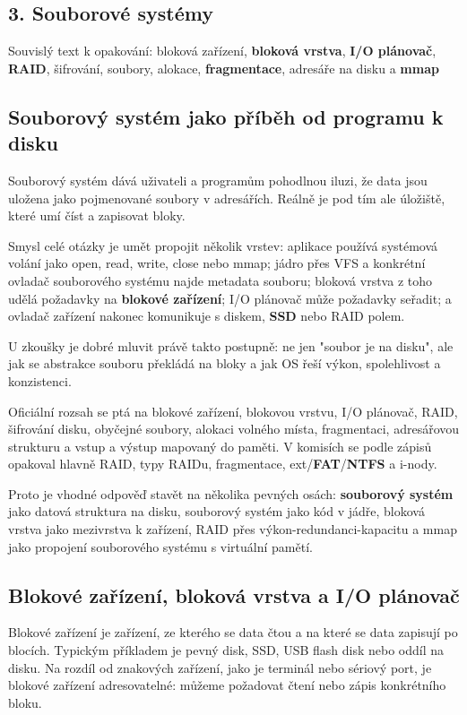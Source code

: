 \subsection*{3. Souborové systémy}

Souvislý text k opakování: bloková zařízení, \textbf{bloková vrstva}, \textbf{I/O plánovač}, \textbf{RAID}, šifrování, soubory, alokace, \textbf{fragmentace}, adresáře na disku a \textbf{mmap}

\subsection*{Souborový systém jako příběh od programu k disku}

Souborový systém dává uživateli a programům pohodlnou iluzi, že data jsou uložena jako pojmenované soubory v adresářích. Reálně je pod tím ale úložiště, které umí číst a zapisovat bloky.

Smysl celé otázky je umět propojit několik vrstev: aplikace používá systémová volání jako open, read, write, close nebo mmap; jádro přes VFS a konkrétní ovladač souborového systému najde metadata souboru; bloková vrstva z toho udělá požadavky na \textbf{blokové zařízení}; I/O plánovač může požadavky seřadit; a ovladač zařízení nakonec komunikuje s diskem, \textbf{SSD} nebo RAID polem.

U zkoušky je dobré mluvit právě takto postupně: ne jen "soubor je na disku", ale jak se abstrakce souboru překládá na bloky a jak OS řeší výkon, spolehlivost a konzistenci.

Oficiální rozsah se ptá na blokové zařízení, blokovou vrstvu, I/O plánovač, RAID, šifrování disku, obyčejné soubory, alokaci volného místa, fragmentaci, adresářovou strukturu a vstup a výstup mapovaný do paměti. V komisích se podle zápisů opakoval hlavně RAID, typy RAIDu, fragmentace, ext/\textbf{FAT}/\textbf{NTFS} a i-nody.

Proto je vhodné odpověď stavět na několika pevných osách: \textbf{souborový systém} jako datová struktura na disku, souborový systém jako kód v jádře, bloková vrstva jako mezivrstva k zařízení, RAID přes výkon-redundanci-kapacitu a mmap jako propojení souborového systému s virtuální pamětí.

\subsection*{Blokové zařízení, bloková vrstva a I/O plánovač}

Blokové zařízení je zařízení, ze kterého se data čtou a na které se data zapisují po blocích. Typickým příkladem je pevný disk, SSD, USB flash disk nebo oddíl na disku. Na rozdíl od znakových zařízení, jako je terminál nebo sériový port, je blokové zařízení adresovatelné: můžeme požadovat čtení nebo zápis konkrétního bloku.

